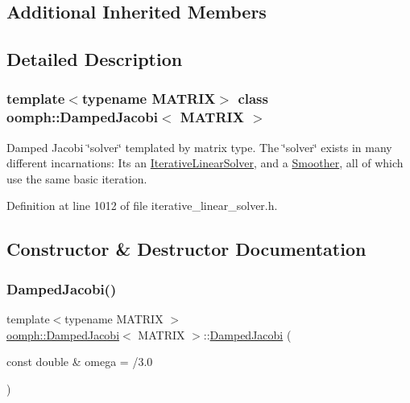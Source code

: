 \subsection*{Additional Inherited Members}


\subsection{Detailed Description}
\subsubsection*{template$<$typename M\+A\+T\+R\+IX$>$\newline
class oomph\+::\+Damped\+Jacobi$<$ M\+A\+T\+R\+I\+X $>$}

Damped Jacobi \char`\"{}solver\char`\"{} templated by matrix type. The \char`\"{}solver\char`\"{} exists in many different incarnations\+: It\textquotesingle{}s an \hyperlink{classoomph_1_1IterativeLinearSolver}{Iterative\+Linear\+Solver}, and a \hyperlink{classoomph_1_1Smoother}{Smoother}, all of which use the same basic iteration. 

Definition at line 1012 of file iterative\+\_\+linear\+\_\+solver.\+h.



\subsection{Constructor \& Destructor Documentation}
\mbox{\label{classoomph_1_1DampedJacobi_aac608c2e9bd7a78eb8a9a2e70119fad6}} 
\subsubsection{\texorpdfstring{Damped\+Jacobi()}{DampedJacobi()}\hspace{0.1cm}{\footnotesize\ttfamily [1/2]}}
{\footnotesize\ttfamily template$<$typename M\+A\+T\+R\+IX $>$ \\
\hyperlink{classoomph_1_1DampedJacobi}{oomph\+::\+Damped\+Jacobi}$<$ M\+A\+T\+R\+IX $>$\+::\hyperlink{classoomph_1_1DampedJacobi}{Damped\+Jacobi} (\begin{DoxyParamCaption}\item[{const double \&}]{omega = {/3.0} }\end{DoxyParamCaption})\hspace{0.3cm}{\ttfamily [inline]}}



